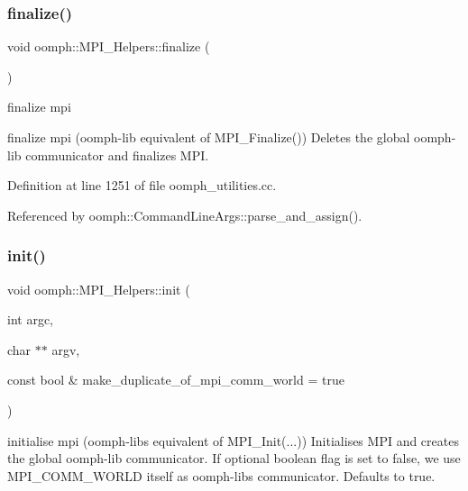\mbox{\label{classoomph_1_1MPI__Helpers_a471bc4697fd5edeea3fb4af1bba0e541}} 
\subsubsection{\texorpdfstring{finalize()}{finalize()}}
{\footnotesize\ttfamily void oomph\+::\+M\+P\+I\+\_\+\+Helpers\+::finalize (\begin{DoxyParamCaption}{ }\end{DoxyParamCaption})\hspace{0.3cm}{\ttfamily [static]}}



finalize mpi 

finalize mpi (oomph-\/lib equivalent of M\+P\+I\+\_\+\+Finalize()) Deletes the global oomph-\/lib communicator and finalizes M\+PI. 

Definition at line 1251 of file oomph\+\_\+utilities.\+cc.



Referenced by oomph\+::\+Command\+Line\+Args\+::parse\+\_\+and\+\_\+assign().

\mbox{\label{classoomph_1_1MPI__Helpers_a663a35b00078ebefdc0ea0b7190212e4}} 
\subsubsection{\texorpdfstring{init()}{init()}}
{\footnotesize\ttfamily void oomph\+::\+M\+P\+I\+\_\+\+Helpers\+::init (\begin{DoxyParamCaption}\item[{int}]{argc,  }\item[{char $\ast$$\ast$}]{argv,  }\item[{const bool \&}]{make\+\_\+duplicate\+\_\+of\+\_\+mpi\+\_\+comm\+\_\+world = {\ttfamily true} }\end{DoxyParamCaption})\hspace{0.3cm}{\ttfamily [static]}}



initialise mpi (oomph-\/libs equivalent of M\+P\+I\+\_\+\+Init(...)) Initialises M\+PI and creates the global oomph-\/lib communicator. If optional boolean flag is set to false, we use M\+P\+I\+\_\+\+C\+O\+M\+M\+\_\+\+W\+O\+R\+LD itself as oomph-\/lib\textquotesingle{}s communicator. Defaults to true. 

